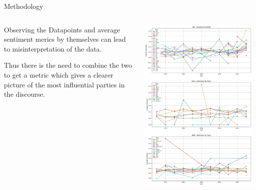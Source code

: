 \documentclass[8pt]{beamer}
\begin{document}
\begin{frame}{Methodology}

\begin{columns}[T]
    \begin{column}{0.5\textwidth}
    
        Observing the Datapoints and average sentiment merics by themselves can lead to misinterpretation of the data.
        
        Thus there is the need to combine the two to get a metric which gives a clearer picture of the most influential parties in the discourse.
    \end{column}
    \begin{column}{0.5\textwidth}
        \includegraphics[width=\textwidth]{img/sentiment_by_party_3_rows.png}
    \end{column}
\end{columns}

    
\end{frame}
\end{document}
